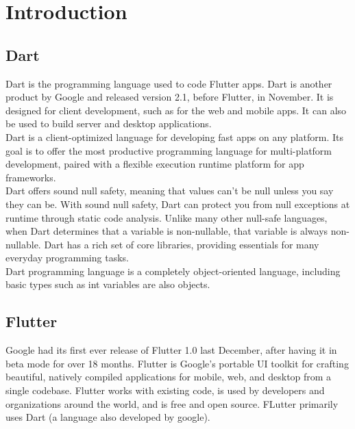 \chapter{Introduction}

\section{Dart}
Dart is the programming language used to code Flutter apps. Dart is another product by Google and released version 2.1, before Flutter, in November. It is designed for client development, such as for the web and mobile apps. It can also be used to build server and desktop applications.
\\ Dart is a client-optimized language for developing fast apps on any platform. Its goal is to offer the most productive programming language for multi-platform development, paired with a flexible execution runtime platform for app frameworks.
\\ Dart offers sound null safety, meaning that values can't be null unless you say they can be. With sound null safety, Dart can protect you from null exceptions at runtime through static code analysis. Unlike many other null-safe languages, when Dart determines that a variable is non-nullable, that variable is always non-nullable. Dart has a rich set of core libraries, providing essentials for many everyday programming tasks.
\\Dart programming language is a completely object-oriented language, including basic types such as int variables are also objects.
\section{Flutter}
 Google had its first ever release of Flutter 1.0 last December, after having it in beta mode for over 18 months. Flutter is Google's portable UI toolkit for
 crafting beautiful, natively compiled applications for mobile, 
 web, and desktop from a single codebase. Flutter works 
 with existing code, is used by developers and organizations
 around the world, and is free and open source. FLutter primarily uses Dart (a language also developed by google).        
 




